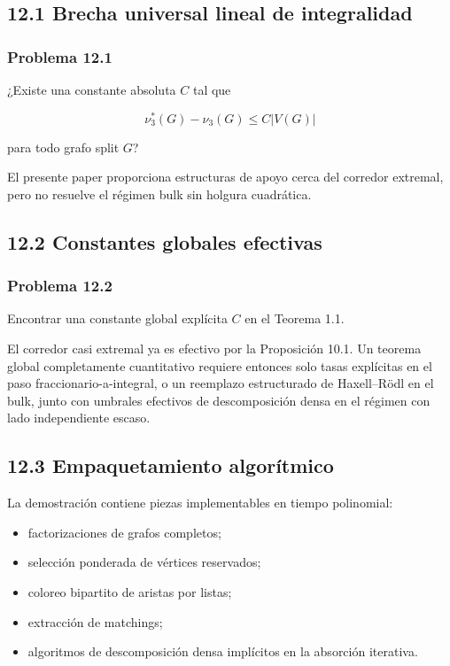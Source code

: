 \documentclass[
  11pt,
]{article}
\providecommand{\tightlist}{%
  \setlength{\itemsep}{0pt}\setlength{\parskip}{0pt}}
\begin{document}
\subsection{12.1 Brecha universal lineal de
integralidad}\label{brecha-universal-lineal-de-integralidad}

\subsubsection{Problema 12.1}\label{problema-12.1}

¿Existe una constante absoluta \(C\) tal que

\[
\nu_3^*(G)-\nu_3(G)
\le C|V(G)|
\]

para todo grafo split \(G\)?

El presente paper proporciona estructuras de apoyo cerca del corredor
extremal, pero no resuelve el régimen bulk sin holgura cuadrática.

\subsection{12.2 Constantes globales
efectivas}\label{constantes-globales-efectivas}

\subsubsection{Problema 12.2}\label{problema-12.2}

Encontrar una constante global explícita \(C\) en el Teorema 1.1.

El corredor casi extremal ya es efectivo por la Proposición 10.1. Un
teorema global completamente cuantitativo requiere entonces solo tasas
explícitas en el paso fraccionario-a-integral, o un reemplazo
estructurado de Haxell--Rödl en el bulk, junto con umbrales efectivos de
descomposición densa en el régimen con lado independiente escaso.

\subsection{12.3 Empaquetamiento
algorítmico}\label{empaquetamiento-algoruxedtmico}

La demostración contiene piezas implementables en tiempo polinomial:

\begin{itemize}
\tightlist
\item
  factorizaciones de grafos completos;
\item
  selección ponderada de vértices reservados;
\item
  coloreo bipartito de aristas por listas;
\item
  extracción de matchings;
\item
  algoritmos de descomposición densa implícitos en la absorción
  iterativa.
\end{itemize}
\end{document}
